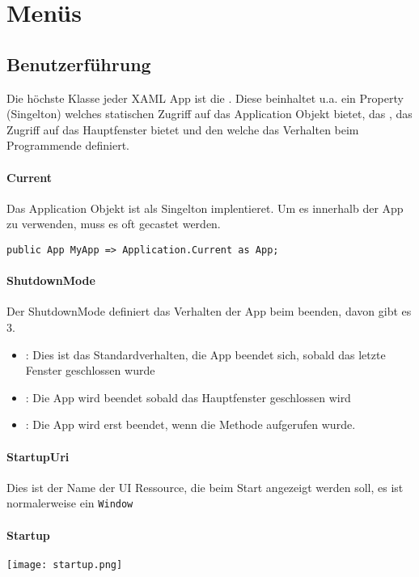 \section{Menüs}
\subsection{Benutzerführung}
Die höchste Klasse jeder XAML App ist die . Diese beinhaltet u.a. ein  Property (Singelton) welches statischen Zugriff auf das Application Objekt bietet, das , das Zugriff auf das Hauptfenster bietet und den  welche das Verhalten beim Programmende definiert.
\paragraph{Current} Das Application Objekt ist als Singelton implentieret. Um es innerhalb der App zu verwenden, muss es oft gecastet werden.
\begin{lstlisting}
public App MyApp => Application.Current as App;
\end{lstlisting}
\paragraph{ShutdownMode} Der ShutdownMode definiert das Verhalten der App beim beenden, davon gibt es 3.
\begin{itemize}
\item {}: Dies ist das Standardverhalten, die App beendet sich, sobald das letzte Fenster geschlossen wurde
\item {}: Die App wird beendet sobald das Hauptfenster geschlossen wird
\item {}: Die App wird erst beendet, wenn die  Methode aufgerufen wurde.
\end{itemize}
\paragraph{StartupUri} Dies ist der Name der UI Ressource, die beim Start angezeigt werden soll, es ist normalerweise ein \verb+Window+

\paragraph{Startup}

\texttt{[image: startup.png]}

